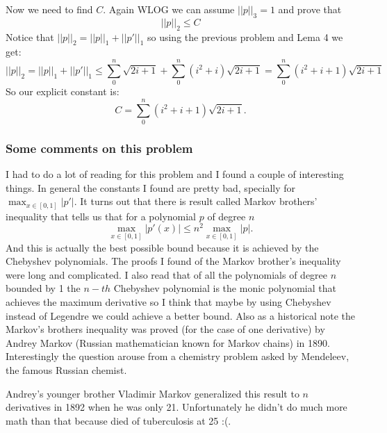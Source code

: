 \documentclass{article}
\begin{document}
Now we need to find $C$. Again WLOG we can assume $||p||_3=1$ and prove that
\[
	||p||_2\leq C
\]
Notice that $||p||_2=||p||_1+ ||p'||_1$ so using the previous problem and Lema 4 we get:
\[
	||p||_2=||p||_1+||p'||_1 \leq \sum_0^n \sqrt{2i+1} + \sum_0^n (i^2+i)\sqrt{2i+1} = \sum_0^n (i^2+i+1)\sqrt{2i+1}
\]
So our explicit constant is:
\[
	C=\sum_0^n (i^2+i+1)\sqrt{2i+1}.
\]
\subsubsection*{Some comments on this problem}
I had to do a lot of reading for this problem and I found a
couple of interesting things. In general the constants I found are pretty bad,
specially for $\max_{x\in[0,1]}|p'|$. It turns out that there is result called
Markov brothers' inequality that tells us that for a polynomial $p$ of degree
$n$
\[
\max_{x\in[0,1]}|p'(x)|\leq n^2 \max_{x\in[0,1]}|p|.
\]
And this is actually the best possible bound because it is achieved by the
Chebyshev polynomials. The proofs I found of the Markov brother's inequality
were long and complicated. I also read that of all the polynomials of degree
$n$ bounded by 1 the $n-th$ Chebyshev polynomial is the monic polynomial that
achieves the maximum derivative so I think that maybe by using Chebyshev
instead of Legendre we could achieve a better bound. Also as a historical note
the Markov's brothers inequality was proved (for the case of one derivative) by
Andrey Markov (Russian mathematician known for Markov chains) in 1890.
Interestingly the question arouse from a chemistry problem asked by Mendeleev,
the famous Russian chemist.

Andrey's younger brother Vladimir Markov generalized this result to $n$
derivatives in 1892 when he was only 21. Unfortunately he didn't do much more
math than that because died of tuberculosis at 25 :(.
\end{document}
